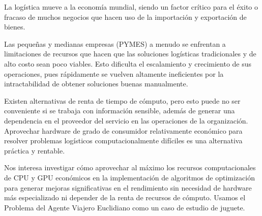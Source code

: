 \documentclass[main.tex]{subfiles}
\begin{document}
La logística mueve a la economía mundial, siendo un factor crítico para el éxito
o fracaso de muchos negocios que hacen uso de la importación y exportación de
bienes. \parencite{logistica}

Las pequeñas y medianas empresas (PYMES) a menudo se enfrentan a limitaciones
de recursos que hacen que las soluciones logísticas tradicionales y de alto
costo sean poco viables. Esto dificulta el escalamiento y crecimiento de sus
operaciones, pues rápidamente se vuelven altamente ineficientes por la
intractabilidad de obtener soluciones buenas manualmente.
\parencite{logistica}\parencite{logistica2}

Existen alternativas de renta de tiempo de cómputo, pero esto puede no ser
conveniente si se trabaja con información sensible, además de generar una
dependencia en el proveedor del servicio en las operaciones de la organización.
\parencite{logistica2} Aprovechar hardware de grado de consumidor relativamente
económico para resolver problemas logísticos computacionalmente difíciles es
una alternativa práctica y rentable.

Nos interesa investigar cómo aprovechar al máximo los recursos computacionales
de CPU y GPU económicos en la implementación de algoritmos de optimización para
generar mejoras significativas en el rendimiento sin necesidad de hardware más
especializado ni depender de la renta de recursos de cómputo. Usamos el
Problema del Agente Viajero Euclidiano como un caso de estudio de juguete.
\end{document}
